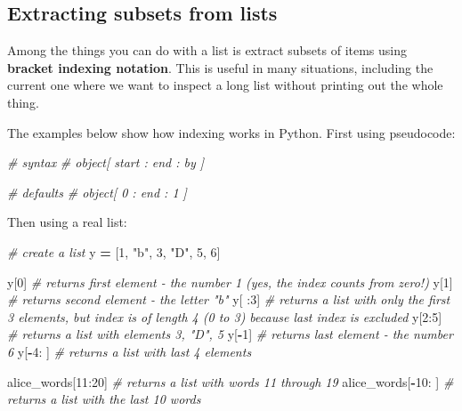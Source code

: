 \documentclass[]{book}
\newenvironment{Shaded}{\begin{snugshade}}{\end{snugshade}}
\newcommand{\CommentTok}[1]{\textcolor[rgb]{0.56,0.35,0.01}{\textit{#1}}}
\newcommand{\DecValTok}[1]{\textcolor[rgb]{0.00,0.00,0.81}{#1}}
\newcommand{\NormalTok}[1]{#1}
\newcommand{\OperatorTok}[1]{\textcolor[rgb]{0.81,0.36,0.00}{\textbf{#1}}}
\newcommand{\StringTok}[1]{\textcolor[rgb]{0.31,0.60,0.02}{#1}}
\begin{document}
\hypertarget{extracting-subsets-from-lists}{%
\subsection{Extracting subsets from lists}\label{extracting-subsets-from-lists}}

Among the things you can do with a list is extract subsets of items using \textbf{bracket indexing notation}. This is useful in many situations, including the current one where we want to inspect a long list without printing out the whole thing.

The examples below show how indexing works in Python. First using pseudocode:

\begin{Shaded}
\begin{Highlighting}[]
\CommentTok{# syntax}
\CommentTok{# object[ start : end : by ]}

\CommentTok{# defaults}
\CommentTok{# object[ 0 : end : 1 ]}
\end{Highlighting}
\end{Shaded}

Then using a real list:

\begin{Shaded}
\begin{Highlighting}[]
\CommentTok{# create a list}
\NormalTok{y }\OperatorTok{=}\NormalTok{ [}\DecValTok{1}\NormalTok{, }\StringTok{"b"}\NormalTok{, }\DecValTok{3}\NormalTok{, }\StringTok{"D"}\NormalTok{, }\DecValTok{5}\NormalTok{, }\DecValTok{6}\NormalTok{]}

\NormalTok{y[}\DecValTok{0}\NormalTok{] }\CommentTok{# returns first element - the number 1 (yes, the index counts from zero!)}
\NormalTok{y[}\DecValTok{1}\NormalTok{] }\CommentTok{# returns second element - the letter "b"}
\NormalTok{y[ :}\DecValTok{3}\NormalTok{] }\CommentTok{# returns a list with only the first 3 elements, but index is of length 4 (0 to 3) because last index is excluded}
\NormalTok{y[}\DecValTok{2}\NormalTok{:}\DecValTok{5}\NormalTok{] }\CommentTok{# returns a list with elements 3, "D", 5}
\NormalTok{y[}\OperatorTok{-}\DecValTok{1}\NormalTok{] }\CommentTok{# returns last element - the number 6 }
\NormalTok{y[}\OperatorTok{-}\DecValTok{4}\NormalTok{: ] }\CommentTok{# returns a list with last 4 elements}
\end{Highlighting}
\end{Shaded}

\begin{Shaded}
\begin{Highlighting}[]
\NormalTok{alice_words[}\DecValTok{11}\NormalTok{:}\DecValTok{20}\NormalTok{] }\CommentTok{# returns a list with words 11 through 19}
\NormalTok{alice_words[}\OperatorTok{-}\DecValTok{10}\NormalTok{: ] }\CommentTok{# returns a list with the last 10 words}
\end{Highlighting}
\end{Shaded}
\end{document}
